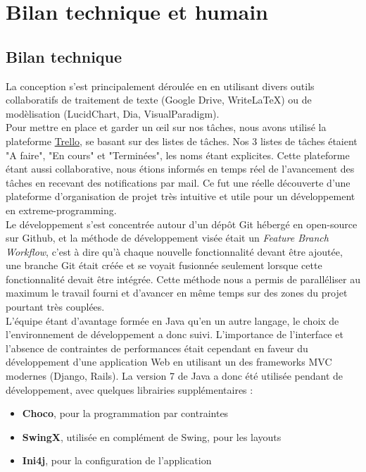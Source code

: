 \documentclass[a4paper]{report}
\begin{document}
\section{Bilan technique et humain}

\subsection{Bilan technique}

La conception s'est principalement déroulée en en utilisant divers outils
collaboratifs de traitement de texte (Google Drive, WriteLaTeX) ou de
modèlisation (LucidChart, Dia, VisualParadigm). \\

Pour mettre en place et garder un œil sur nos tâches, nous avons utilisé la
plateforme \href{https://trello.com/}{Trello}, se basant sur des listes de
tâches. Nos 3 listes de tâches étaient "A faire", "En cours" et "Terminées",
les noms étant explicites. Cette plateforme étant aussi collaborative, nous
étions informés en temps réel de l'avancement des tâches en recevant des
notifications par mail. Ce fut une réelle découverte d'une plateforme
d'organisation de projet très intuitive et utile pour un développement en
extreme-programming. \\

Le développement s'est concentrée autour d'un dépôt Git hébergé
en open-source sur Github, et la méthode de développement visée était un
\emph{Feature Branch Workflow}, c'est à dire qu'à chaque nouvelle
fonctionnalité devant être ajoutée, une branche Git était créée et se voyait
fusionnée seulement lorsque cette fonctionnalité devait être intégrée. Cette
méthode nous a permis de paralléliser au maximum le travail fourni et d'avancer
en même temps sur des zones du projet pourtant très couplées. \\

L'équipe étant d'avantage formée en Java qu'en un autre langage, le choix de
l'environnement de développement a donc suivi. L'importance de l'interface et
l'absence de contraintes de performances était cependant en faveur du
développement d'une application Web en utilisant un des frameworks MVC modernes
(Django, Rails). La version 7 de Java a donc été utilisée pendant de
développement, avec quelques librairies supplémentaires : \\

\begin{itemize}
    \item \textbf{Choco}, pour la programmation par contraintes
    \item \textbf{SwingX}, utilisée en complément de Swing, pour les layouts
    \item \textbf{Ini4j}, pour la configuration de l'application
\end{itemize}
\end{document}
